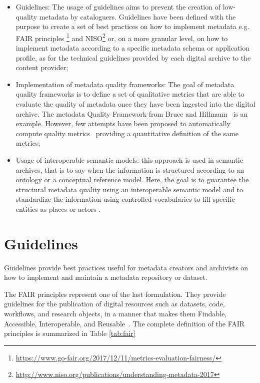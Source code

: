 \documentclass[epsfig,a4paper,12pt,titlepage]{book}
\begin{document}
\begin{itemize}
    \item Guidelines: The usage of guidelines aims to prevent the creation of low-quality metadata by  cataloguers. Guidelines have been defined with the purpose to create a set of best practices on how to implement metadata e.g.  FAIR principles \footnote{\url{https://www.go-fair.org/2017/12/11/metrics-evaluation-fairness/}} and NISO\footnote{\url{http://www.niso.org/publications/understanding-metadata-2017}} or, on a more granular level,  on how to implement metadata according to a specific metadata schema or application profile, as for the technical guidelines provided by each digital archive to the content provider;  
    \item Implementation of metadata quality frameworks: The goal of metadata quality frameworks is to define a set of qualitative metrics that are able to evaluate the quality of metadata once they have  been ingested into the digital archive. The metadata Quality Framework from Bruce and Hillmann~\cite{1} is an example. However, few attempts have been proposed to automatically compute quality metrics~\cite{2,3,7,38, margaritopoulos2009fine} providing a quantitative definition of the same metrics;
    \item Usage of interoperable semantic models: this approach is used in semantic archives, that is to say when the information is structured according to an ontology or a conceptual reference model. Here, the goal is to guarantee the structural metadata quality using an interoperable semantic model and to standardize the information using controlled vocabularies to fill specific entities as places or actors \cite{burrows2020modelling}.  
\end{itemize}
\section{Guidelines}
\label{guideline}

Guidelines provide best practices useful for metadata creators and archivists on how to implement and maintain a metadata repository or dataset.

The FAIR principles represent one of the last formulation. They provide guidelines for the publication of digital resources such as datasets, code, workflows, and research objects, in a manner that makes them Findable, Accessible, Interoperable, and Reusable~\cite{wilkinson2016fair}. The complete definition of the FAIR principles is summarized in Table \ref{tab:fair}
\end{document}

